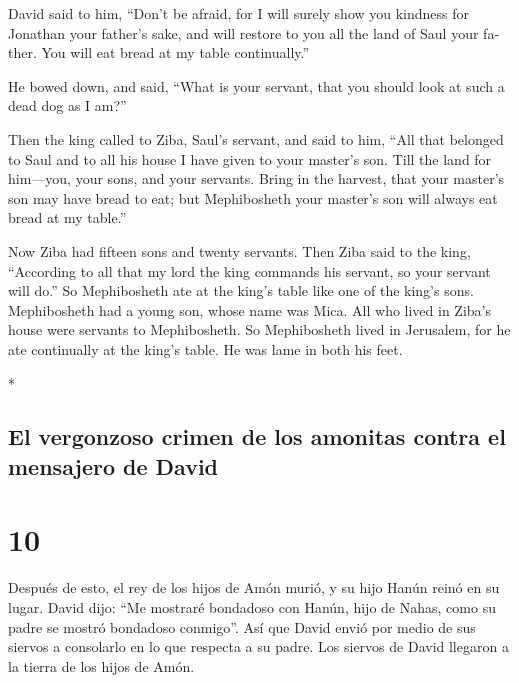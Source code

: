 \begin{paracol}{2}
\begin{otherlanguage}{english}
 David said to him, ``Don't be afraid, for I will surely
show you kindness for Jonathan your father's sake, and will restore to
you all the land of Saul your father. You will eat bread at my table
continually.''

 He bowed down, and said, ``What is your servant, that you
should look at such a dead dog as I am?''

 Then the king called to Ziba, Saul's servant, and said to
him, ``All that belonged to Saul and to all his house I have given to
your master's son.  Till the land for him---you, your
sons, and your servants. Bring in the harvest, that your master's son
may have bread to eat; but Mephibosheth your master's son will always
eat bread at my table.''

Now Ziba had fifteen sons and twenty servants.  Then Ziba
said to the king, ``According to all that my lord the king commands his
servant, so your servant will do.'' So Mephibosheth ate at the king's
table like one of the king's sons.  Mephibosheth had a
young son, whose name was Mica. All who lived in Ziba's house were
servants to Mephibosheth.  So Mephibosheth lived in
Jerusalem, for he ate continually at the king's table. He was lame in
both his feet.

\end{otherlanguage}

\switchcolumn[0]*

\hypertarget{el-vergonzoso-crimen-de-los-amonitas-contra-el-mensajero-de-david}{%
\subsection{El vergonzoso crimen de los amonitas contra el mensajero de
David}\label{el-vergonzoso-crimen-de-los-amonitas-contra-el-mensajero-de-david}}

\hypertarget{section-18}{%
\section{10}\label{section-18}}

 Después de esto, el rey de los hijos de Amón murió, y su
hijo Hanún reinó en su lugar.  David dijo: ``Me mostraré
bondadoso con Hanún, hijo de Nahas, como su padre se mostró bondadoso
conmigo''. Así que David envió por medio de sus siervos a consolarlo en
lo que respecta a su padre. Los siervos de David llegaron a la tierra de
los hijos de Amón.


\end{paracol}
